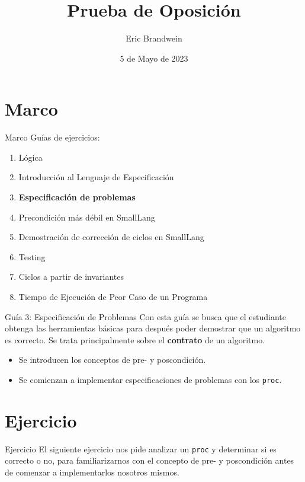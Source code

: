 \documentclass{beamer}
\title{Prueba de Oposición}
\author{Eric Brandwein}
\date{5 de Mayo de 2023}
\begin{document}
\frame{\titlepage}

\section{Marco}
\begin{frame}{Marco}
    Guías de ejercicios:
    \begin{enumerate}
        \item Lógica
        \item Introducción al Lenguaje de Especificación
        \item {\bfseries\color{blue}Especificación de problemas}
        \item Precondición más débil en SmallLang
        \item Demostración de corrección de ciclos en SmallLang
        \item Testing
        \item Ciclos a partir de invariantes
        \item Tiempo de Ejecución de Peor Caso de un Programa
    \end{enumerate}
\end{frame}

\begin{frame}{Guía 3: Especificación de Problemas}
    \large
    Con esta guía se busca que el estudiante obtenga las herramientas básicas para después poder demostrar que un algoritmo es correcto. Se trata principalmente sobre el \textbf{contrato} de un algoritmo.\pause
    \vspace{2em}
    \begin{itemize}
        \item Se introducen los conceptos de pre- y poscondición.\pause
        \item Se comienzan a implementar especificaciones de problemas con los \texttt{proc}. 
    \end{itemize}
\end{frame}

\section{Ejercicio}
\begin{frame}{Ejercicio}
    \large
    El siguiente ejercicio nos pide analizar un \texttt{proc} y determinar si es correcto o no, para familiarizarnos con el concepto de pre- y poscondición antes de comenzar a implementarlos nosotros mismos. 

\end{frame}
\end{document}
